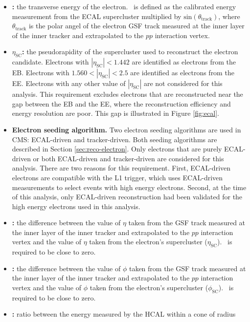 \begin{itemize}
  \item {\bf \et:} the transverse energy of the electron. \et~is defined
    as the calibrated energy measurement from the ECAL supercluster
    multiplied by $\text{sin}(\theta_{\text{track}})$, where $\theta_{\text{track}}$
    is the polar angel of the electron GSF track measured at the inner layer of the 
    inner tracker and extrapolated to the $pp$ interaction vertex.    
  \item {\bf $\eta_{\text{SC}}$:} the pseudorapidity of the supercluster 
    used to reconstruct the electron candidate.  
    Electrons with $|\eta_{\text{SC}}| < 1.442$ are identified as electrons from the EB.
    Electrons with $1.560 < |\eta_{\text{SC}}| < 2.5$ are identified as electrons from the EE.
    Electrons with any other value of $|\eta_{\text{SC}}|$ are not considered for this analysis.
    This requirement excludes electrons that are reconstructed near the gap between the EB and the EE,
    where the reconstruction efficiency and energy resolution are poor.
    This gap is illustrated in Figure \ref{fig:ecal}.
  \item {\bf Electron seeding algorithm.}  Two electron seeding algorithms are used in CMS:
    ECAL-driven and tracker-driven.  Both seeding algorithms are described in Section \ref{sec:reco-electron}.
    Only electrons that are purely ECAL-driven or both ECAL-driven and tracker-driven are considered for this analysis.
    There are two reasons for this requirement.  First, ECAL-driven
    electrons are compatible with the L1 trigger, which uses ECAL-driven measurements to select
    events with high energy electrons.  Second, at the time of this analysis, 
    only ECAL-driven reconstruction had been validated for the high energy electrons used in this analysis.
  \item {\bf \dEtaIn:} the difference between the value of $\eta$ taken from the GSF track
    measured at the inner layer of the inner tracker and extrapolated to the $pp$ interaction vertex
    and the value of $\eta$ taken from the electron's supercluster ($\eta_{\text{SC}}$).
    \dEtaIn~is required to be close to zero.
  \item {\bf \dPhiIn:} the difference between the value of $\phi$ taken from the GSF track
    measured at the inner layer of the inner tracker and extrapolated to the $pp$ interaction vertex
    and the value of $\phi$ taken from the electron's supercluster ($\phi_{\text{SC}}$).
    \dPhiIn~is required to be close to zero.
  \item {\bf \HoE:} ratio between the energy measured by the HCAL within a cone of radius 

\end{itemize}
